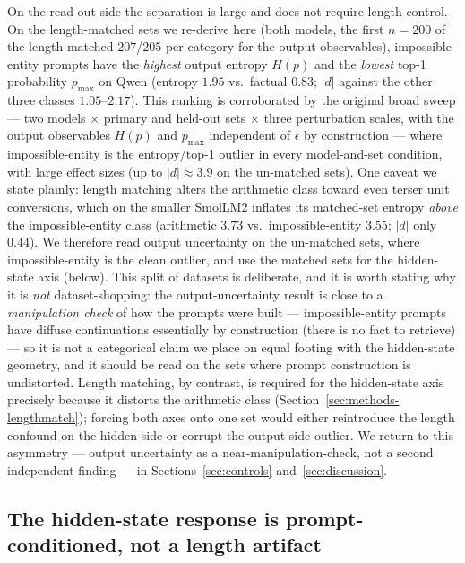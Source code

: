 \documentclass{article}
\begin{document}
On the read-out side the separation is large and does not require length control. On the
length-matched sets we re-derive here (both models, the first $n=200$ of the length-matched
$207$/$205$ per category for the output observables),
impossible-entity prompts have the \emph{highest} output entropy $H(p)$ and the \emph{lowest}
top-1 probability $p_{\max}$ on Qwen (entropy $1.95$ vs.\ factual $0.83$; $|d|$ against the other
three classes $1.05$--$2.17$). This ranking is corroborated by the original broad sweep --- two
models $\times$ primary and held-out sets $\times$ three perturbation scales, with the output
observables $H(p)$ and $p_{\max}$ independent of $\epsilon$ by construction --- where
impossible-entity is the entropy/top-1 outlier in every model-and-set condition, with large
effect sizes (up to $|d|\approx3.9$ on the un-matched sets). One caveat we state plainly: length
matching alters the arithmetic class toward even terser unit conversions, which on the smaller SmolLM2 inflates
its matched-set entropy \emph{above} the impossible-entity class (arithmetic $3.73$ vs.\
impossible-entity $3.55$; $|d|$ only $0.44$). We therefore read output uncertainty on the un-matched
sets, where impossible-entity is the clean outlier, and use the matched sets for the
hidden-state axis (below). This split of datasets is deliberate, and it is worth stating why it is
\emph{not} dataset-shopping: the output-uncertainty result is close to a \emph{manipulation check} of
how the prompts were built --- impossible-entity prompts have diffuse continuations essentially by
construction (there is no fact to retrieve) --- so it is not a categorical claim we place on equal
footing with the hidden-state geometry, and it should be read on the sets where prompt construction is
undistorted. Length matching, by contrast, is required for the hidden-state axis precisely because it
distorts the arithmetic class (Section~\ref{sec:methods-lengthmatch}); forcing both axes onto one set
would either reintroduce the length confound on the hidden side or corrupt the output-side outlier. We
return to this asymmetry --- output uncertainty as a near-manipulation-check, not a second independent
finding --- in Sections~\ref{sec:controls} and~\ref{sec:discussion}.

\subsection{The hidden-state response is prompt-conditioned, not a length artifact}
\label{sec:results-alg1}
\end{document}
